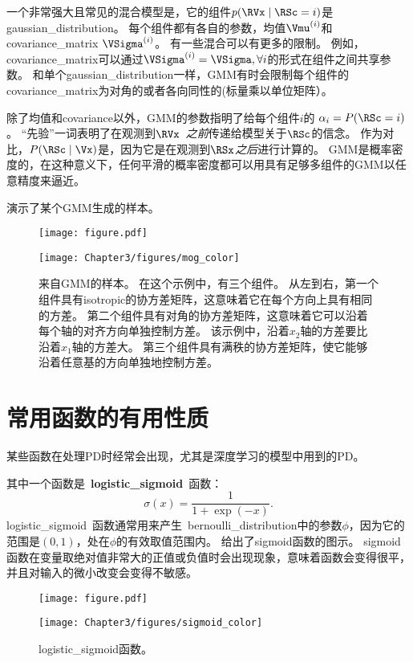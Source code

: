 一个非常强大且常见的混合模型是，它的组件$p(\RVx \mid \RSc= i)$是\gls{gaussian_distribution}。
每个组件都有各自的参数，均值$\Vmu^{(i)}$和\gls{covariance_matrix} $\VSigma^{(i)}$。
有一些混合可以有更多的限制。
例如，\gls{covariance_matrix}可以通过$\VSigma^{(i)} = \VSigma, \forall i$的形式在组件之间共享参数。
和单个\gls{gaussian_distribution}一样，\gls{GMM}有时会限制每个组件的\gls{covariance_matrix}为对角的或者各向同性的(标量乘以单位矩阵）。

除了均值和\gls{covariance}以外，\gls{GMM}的参数指明了给每个组件$i$的 $\alpha_i = P(\RSc = i)$。
``先验''一词表明了在观测到$\RVx$~\emph{之前}传递给模型关于$\RSc$的信念。
作为对比，$P(\RSc \mid \Vx)$是，因为它是在观测到$\RSx$\emph{之后}进行计算的。
\gls{GMM}是概率密度的，在这种意义下，任何平滑的概率密度都可以用具有足够多组件的\gls{GMM}以任意精度来逼近。

演示了某个\gls{GMM}生成的样本。
\begin{figure}[!htb]
\ifOpenSource
\centerline{\texttt{[image: figure.pdf]}}
\else
\centerline{\texttt{[image: Chapter3/figures/mog\_color]}}
\fi
\caption{来自\gls{GMM}的样本。
在这个示例中，有三个组件。
从左到右，第一个组件具有\gls{isotropic}的协方差矩阵，这意味着它在每个方向上具有相同的方差。 第二个组件具有对角的协方差矩阵，这意味着它可以沿着每个轴的对齐方向单独控制方差。
该示例中，沿着$x_2$轴的方差要比沿着$x_1$轴的方差大。 第三个组件具有满秩的协方差矩阵，使它能够沿着任意基的方向单独地控制方差。}
\label{fig:chap3_mog_color}
\end{figure}


\section{常用函数的有用性质}
\label{sec:useful_properties_of_common_functions}

某些函数在处理\gls{PD}时经常会出现，尤其是深度学习的模型中用到的\gls{PD}。


其中一个函数是~\textbf{\gls{logistic_sigmoid}}~函数：
\begin{equation}
\sigma(x) = \frac{1}{1+\exp(-x)}.
\end{equation}
\gls{logistic_sigmoid}~函数通常用来产生~\gls{bernoulli_distribution}中的参数$\phi$，因为它的范围是$(0,1)$，处在$\phi$的有效取值范围内。
给出了sigmoid函数的图示。
sigmoid函数在变量取绝对值非常大的正值或负值时会出现现象，意味着函数会变得很平，并且对输入的微小改变会变得不敏感。
\begin{figure}[!htb]
\ifOpenSource
\centerline{\texttt{[image: figure.pdf]}}
\else
\centerline{\texttt{[image: Chapter3/figures/sigmoid\_color]}}
\fi
\caption{\gls{logistic_sigmoid}函数。}
\label{fig:chap3_sigmoid_color}
\end{figure}

